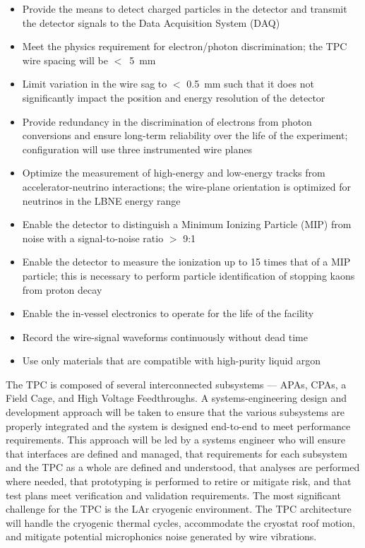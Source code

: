 \begin{itemize}	
\item Provide the means to detect charged particles in the detector and transmit the detector signals to the Data Acquisition System (DAQ)
\item Meet the physics requirement for electron/photon discrimination;  the TPC wire spacing will be $<$~5~mm
\item Limit variation in the wire sag to $<$ 0.5~mm such that it does not significantly impact the position and energy resolution of the detector
\item Provide redundancy in the discrimination of electrons from photon conversions and ensure long-term reliability over the life of the experiment;  configuration will use three instrumented wire planes
\item Optimize the measurement of high-energy and low-energy tracks from accelerator-neutrino interactions; the wire-plane orientation is optimized for neutrinos in the LBNE energy range
\item Enable the detector to distinguish a Minimum Ionizing Particle (MIP) from noise with a signal-to-noise ratio $>$ 9:1
\item Enable the detector to measure the ionization up to 15 times that of a MIP particle; this is necessary to perform particle identification of stopping kaons from proton decay
\item Enable the in-vessel electronics to operate for the life of the facility
\item Record the wire-signal waveforms continuously without dead time
\item Use only materials that are compatible with high-purity liquid argon

\end{itemize}

The TPC is composed of several interconnected subsystems --- APAs, CPAs, a Field Cage, and High Voltage 
Feedthroughs. A systems-engineering design and development approach will be taken to ensure that the 
various subsystems are properly integrated and the system is designed end-to-end to meet performance 
requirements. This approach will be led by a systems engineer who will ensure that interfaces are defined 
and managed, that requirements for each subsystem and the TPC as a whole are defined and understood, 
that analyses are performed where needed, that prototyping is performed to retire or mitigate risk, and that test 
plans meet verification and validation requirements. The most significant challenge for the TPC is the LAr 
cryogenic environment. The TPC architecture will handle the cryogenic thermal cycles, accommodate the 
cryostat roof motion, and mitigate potential microphonics noise generated by wire vibrations.

